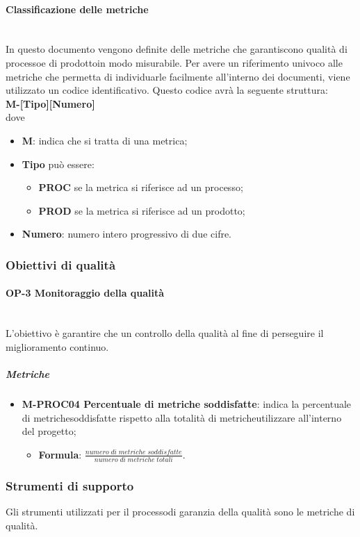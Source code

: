 \paragraph{Classificazione delle metriche} \mbox{}\\ [1mm]
In questo documento vengono definite delle metriche che garantiscono qualità di processo\glosp e di prodotto\glosp in modo misurabile.
Per avere un riferimento univoco alle metriche che permetta di individuarle facilmente all'interno dei documenti, viene utilizzato un codice identificativo. Questo codice avrà la seguente struttura: \\
\textbf{M-[Tipo][Numero]} \\
dove 
\begin{itemize}
	\item \textbf{M}: indica che si tratta di una metrica;
	\item \textbf{Tipo} può essere:
	\begin{itemize}
		\item \textbf{PROC} se la metrica si riferisce ad un processo;
		\item \textbf{PROD} se la metrica si riferisce ad un prodotto;
	\end{itemize}
	\item \textbf{Numero}: numero intero progressivo di due cifre.
\end{itemize}

\subsubsection{Obiettivi di qualità}
	\paragraph{OP-3 Monitoraggio della qualità} \mbox{}\\ [1mm]
		L'obiettivo è garantire che un controllo della qualità al fine di perseguire il miglioramento continuo.
		\subparagraph{Metriche}
			\begin{itemize}
				\item \textbf{M-PROC04 Percentuale di metriche soddisfatte}: indica la percentuale di metriche\glosp soddisfatte rispetto alla totalità di metriche\glosp utilizzare all'interno del progetto\glo;
				\begin{itemize}
					\item[] \textbf{Formula}: $\frac{numero \; di \; metriche \; soddisfatte}{numero \; di \; metriche \; totali}$.
				\end{itemize}
			\end{itemize}
\subsubsection{Strumenti di supporto}
Gli strumenti utilizzati per il processo\glosp di garanzia della qualità sono le metriche di qualità.

